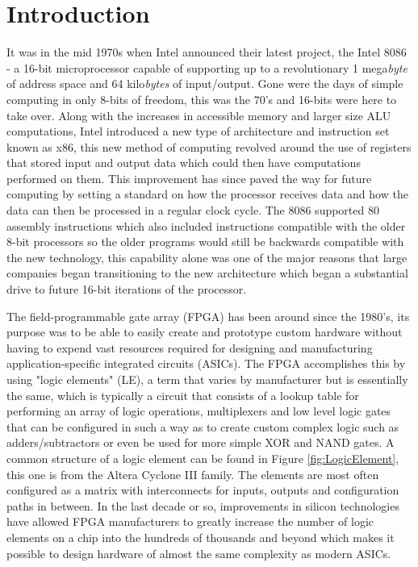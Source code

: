 \documentclass[11pt,peerreview, onecolumn]{IEEEtran}
\begin{document}
\section{Introduction}
It was in the mid 1970s when Intel announced their latest project, the Intel 8086 -  a 16-bit microprocessor capable of supporting up to a revolutionary 1 mega{\em byte} of address space and 64 kilo{\em bytes} of input/output. Gone were the days of simple computing in only 8-bits of freedom, this was the 70's and 16-bits were here to take over. Along with the increases in accessible memory and larger size ALU computations, Intel introduced a new type of architecture and instruction set known as x86, this new method of computing revolved around the use of registers that stored input and output data which could then have computations performed on them. This improvement has since paved the way for future computing by setting a standard on how the processor receives data and how the data can then be processed in a regular clock cycle. The 8086 supported 80 assembly instructions which also included instructions compatible with the older 8-bit processors so the older programs would still be backwards compatible with the new technology, this capability alone was one of the major reasons that large companies began transitioning to the new architecture which began a substantial drive to future 16-bit iterations of the processor.

The field-programmable gate array (FPGA) has been around since the 1980's, its purpose was to be able to easily create and prototype custom hardware without having to expend vast resources required for designing and manufacturing application-specific integrated circuits (ASICs). The FPGA accomplishes this by using "logic elements" (LE), a term that varies by manufacturer but is essentially the same, which is typically a circuit that consists of a lookup table for performing an array of logic operations,  multiplexers and low level logic gates that can be configured in such a way as to create custom complex logic such as adders/subtractors or even be used for more simple XOR and NAND gates. A common structure of a logic element can be found in Figure \ref{fig:LogicElement}, this one is from the Altera Cyclone III family. The elements  are most often configured as a matrix with interconnects for inputs, outputs and configuration paths in between. In the last decade or so, improvements in silicon technologies have allowed FPGA manufacturers to greatly increase the number of logic elements on a chip into the hundreds of thousands and beyond which makes it possible to design hardware of almost the same complexity as modern ASICs.
\end{document}
